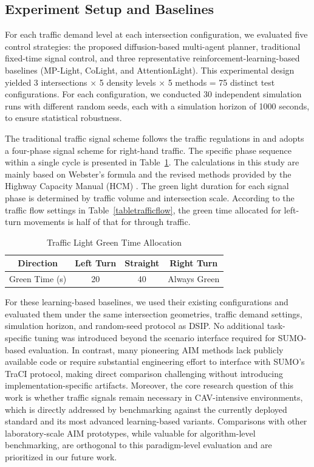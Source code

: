 \documentclass[journal]{IEEEtran}
\begin{document}
\subsection{Experiment Setup and Baselines}
For each traffic demand level at each intersection configuration, we evaluated five control strategies: the proposed diffusion-based multi-agent planner, traditional fixed-time signal control, and three representative reinforcement-learning-based baselines (MP-Light, CoLight, and AttentionLight). This experimental design yielded 3 intersections $\times$ 5 density levels $\times$ 5 methods = 75 distinct test configurations. For each configuration, we conducted 30 independent simulation runs with different random seeds, each with a simulation horizon of 1000 seconds, to ensure statistical robustness.

The traditional traffic signal scheme follows the traffic regulations in \cite{PRC_Traffic_Reg_2004} and adopts a four-phase signal scheme for right-hand traffic. The specific phase sequence within a single cycle is presented in Table~\ref{tabgreentimeallocation}. The calculations in this study are mainly based on Webster's formula \cite{webster1958} and the revised methods provided by the Highway Capacity Manual (HCM) \cite{morris2010}. The green light duration for each signal phase is determined by traffic volume and intersection scale. According to the traffic flow settings in Table~\ref{tabletrafficflow}, the green time allocated for left-turn movements is half of that for through traffic.

\begin{table}[!t]
  \centering
  \caption{Traffic Light Green Time Allocation} 
  \begin{tabular}{cccc} 
    \toprule
    Direction & Left Turn & Straight & Right Turn \\ 
    \midrule
    Green Time (s) & 20 & 40 & Always Green \\ 
    \bottomrule
  \end{tabular}
  \label{tabgreentimeallocation} 
\end{table}



For these learning-based baselines, we used their existing configurations and evaluated them under the same intersection geometries, traffic demand settings, simulation horizon, and random-seed protocol as DSIP. No additional task-specific tuning was introduced beyond the scenario interface required for SUMO-based evaluation. In contrast, many pioneering AIM methods lack publicly available code or require substantial engineering effort to interface with SUMO's TraCI protocol, making direct comparison challenging without introducing implementation-specific artifacts. Moreover, the core research question of this work is whether traffic signals remain necessary in CAV-intensive environments, which is directly addressed by benchmarking against the currently deployed standard and its most advanced learning-based variants. Comparisons with other laboratory-scale AIM prototypes, while valuable for algorithm-level benchmarking, are orthogonal to this paradigm-level evaluation and are prioritized in our future work.
\end{document}
